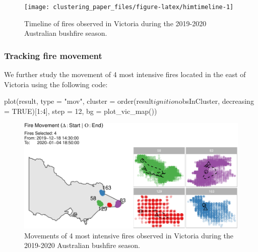 \begin{Schunk}
\begin{figure}

{\centering \texttt{[image: clustering\_paper\_files/figure-latex/himtimeline-1]} 

}

\caption[Timeline of fires observed in Victoria during the 2019-2020 Australian bushfire season]{Timeline of fires observed in Victoria during the 2019-2020 Australian bushfire season.}\label{fig:himtimeline}
\end{figure}
\end{Schunk}

\hypertarget{tracking-fire-movement}{%
\subsubsection{Tracking fire movement}\label{tracking-fire-movement}}

We further study the movement of 4 most intensive fires located in the
east of Victoria using the following code:

\begin{Schunk}
\begin{Sinput}
plot(result, 
     type = "mov", 
     cluster = order(result$ignition$obsInCluster,
                     decreasing = TRUE)[1:4], 
     step = 12, 
     bg = plot_vic_map())
\end{Sinput}
\begin{figure}

{\centering \includegraphics[width=0.8\linewidth]{clustering_paper_files/figure-latex/firemovem-1} 

}

\caption[Movements of 4 most intensive fires observed in Victoria during the 2019-2020 Australian bushfire season]{Movements of 4 most intensive fires observed in Victoria during the 2019-2020 Australian bushfire season.}\label{fig:firemovem}
\end{figure}
\end{Schunk}

